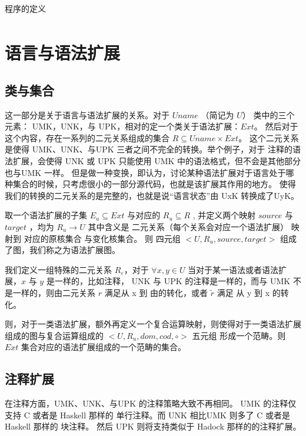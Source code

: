 \documentclass{ctexart}
\begin{document}
程序的定义
\begin{align*}
    
\end{align*}

\section{语言与语法扩展}
\label{sec:languageextension}

\subsection{类与集合}
\label{sec:langexte:classNset}

这一部分是关于语言与语法扩展的关系。对于 $Uname$ （简记为 $U$） 类中的三个元素： UMK，UNK，与 UPK，相对的定一个类关于语法扩展：$Ext$。
然后对于这个内容，存在一系列的二元关系组成的集合 $ R \subseteq Uname \times Ext $。 这个二元关系是使得 UMK、UNK、与UPK
三者之间不完全的转换。举个例子，对于 注释的语法扩展，会使得 UNK 或 UPK 只能使用 UMK 中的语法格式，但不会是其他部分也与UMK 一样。
但是做一种变换，即认为，讨论某种语法扩展对于语言处于哪种集合的时候，只考虑很小的一部分源代码，也就是该扩展其作用的地方。
使得 我们的转换的二元关系的是完整的，也就是说“语言状态”由 UxK 转换成了UyK。

取一个语法扩展的子集 $E_u \subseteq Ext$ 与对应的 $R_u \subseteq R$ , 并定义两个映射 $source$ 与 $target$ ，均为
$ R_u \rightarrow U$ 其中含义是 二元关系（每个关系会对应一个语法扩展） 映射到 对应的原核集合 与变化核集合。
则 四元组 $<U,R_u,source,target>$ 组成了图，我们称之为语法扩展图。

我们定义一组特殊的二元关系 $R_\varepsilon$，对于 $ \forall x,y \in U$ 当对于某一语法或者语法扩展，$x$ 与 $y$ 是一样的，比如注释，
UNK 与 UPK 的注释是一样的，而与 UMK 不是一样的，则由二元关系 $r$ 满足从 x 到 由的转化，或者 $\widetilde{r}$ 满足 从 y 到 x 的转化。

则，对于一类语法扩展，额外再定义一个复合运算映射，则使得对于一类语法扩展组成的图与复合运算组成的 $<U,R_u,dom,cod,\circ>$ 五元组
形成一个范畴。则 $Ext$ 集合对应的语法扩展组成的一个范畴的集合。


\subsection{注释扩展}
\label{sec:langexte:comment}

在注释方面，UMK、UNK、与UPK 的注释策略大致不再相同。 UMK 的注释仅支持 C 或者是 Haskell 那样的 单行注释。而 UNK 相比UMK 则多了
C 或者是 Haskell 那样的 块注释。 然后 UPK 则将支持类似于 Hadock 那样的的注释扩展。
\end{document}
